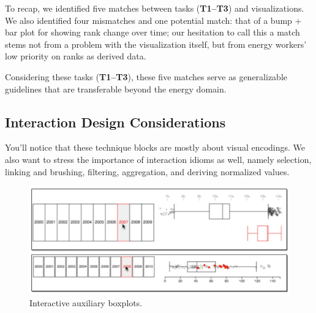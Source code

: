 \documentclass[journal]{vgtc}                %
\begin{document}
To recap, we identified five matches between tasks ({\bf T1--T3}) and visualizations. 
We also identified four mismatches and one potential match: that of a bump + bar plot for showing rank change over time; our hesitation to call this a match stems not from a problem with the visualization itself, but from energy workers' low priority on ranks as derived data.

Considering these tasks ({\bf T1--T3}), these five matches serve as generalizable guidelines that are transferable beyond the energy domain.


\subsection{Interaction Design Considerations}
\label{design-interaction}


You'll notice that these technique blocks are mostly about visual encodings. 
We also want to stress the importance of interaction idioms as well, namely selection, linking and brushing, filtering, aggregation, and deriving normalized values.

\begin{figure}[ht]
	\centering
	\includegraphics[width=\columnwidth]{figures/d3-boxplots.pdf}
	\vspace{-0.6cm}
	\caption{Interactive auxiliary boxplots.}
	\label{fig:interactive-boxplots}
	\vspace{-0.3cm}
\end{figure}
\end{document}
